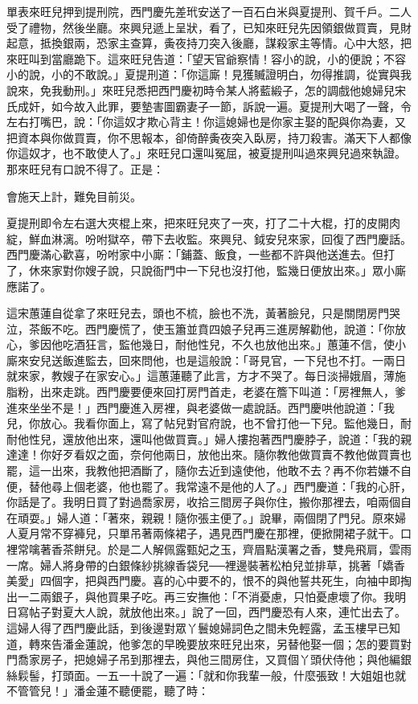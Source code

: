 單表來旺兒押到提刑院，西門慶先差玳安送了一百石白米與夏提刑、賀千戶。二人受了禮物，然後坐廳。來興兒遞上呈狀，看了，已知來旺兒先因領銀做買賣，見財起意，抵換銀兩，恐家主查算，夤夜持刀突入後廳，謀殺家主等情。心中大怒，把來旺叫到當廳跪下。這來旺兒告道：「望天官爺察情！容小的說，小的便說；不容小的說，小的不敢說。」夏提刑道：「你這廝！見獲贓證明白，勿得推調，從實與我說來，免我動刑。」來旺兒悉把西門慶初時令某人將藍緞子，怎的調戲他媳婦兒宋氏成奸，如今故入此罪，要墊害圖霸妻子一節，訴說一遍。夏提刑大喝了一聲，令左右打嘴巴，說：「你這奴才欺心背主！你這媳婦也是你家主娶的配與你為妻，又把資本與你做買賣，你不思報本，卻倚醉夤夜突入臥房，持刀殺害。滿天下人都像你這奴才，也不敢使人了。」來旺兒口還叫冤屈，被夏提刑叫過來興兒過來執證。那來旺兒有口說不得了。正是：

會施天上計，難免目前災。

夏提刑即令左右選大夾棍上來，把來旺兒夾了一夾，打了二十大棍，打的皮開肉綻，鮮血淋漓。吩咐獄卒，帶下去收監。來興兒、鉞安兒來家，回復了西門慶話。西門慶滿心歡喜，吩咐家中小廝：「鋪蓋、飯食，一些都不許與他送進去。但打了，休來家對你嫂子說，只說衙門中一下兒也沒打他，監幾日便放出來。」眾小廝應諾了。

這宋蕙蓮自從拿了來旺兒去，頭也不梳，臉也不洗，黃著臉兒，只是關閉房門哭泣，茶飯不吃。西門慶慌了，使玉簫並賁四娘子兒再三進房解勸他，說道：「你放心，爹因他吃酒狂言，監他幾日，耐他性兒，不久也放他出來。」蕙蓮不信，使小廝來安兒送飯進監去，回來問他，也是這般說：「哥見官，一下兒也不打。一兩日就來家，教嫂子在家安心。」這蕙蓮聽了此言，方才不哭了。每日淡掃娥眉，薄施脂粉，出來走跳。西門慶要便來回打房門首走，老婆在簷下叫道：「房裡無人，爹進來坐坐不是！」西門慶進入房裡，與老婆做一處說話。西門慶哄他說道：「我兒，你放心。我看你面上，寫了帖兒對官府說，也不曾打他一下兒。監他幾日，耐耐他性兒，還放他出來，還叫他做買賣。」婦人摟抱著西門慶脖子，說道：「我的親達達！你好歹看奴之面，奈何他兩日，放他出來。隨你教他做買賣不教他做買賣也罷，這一出來，我教他把酒斷了，隨你去近到遠使他，他敢不去？再不你若嫌不自便，替他尋上個老婆，他也罷了。我常遠不是他的人了。」西門慶道：「我的心肝，你話是了。我明日買了對過喬家房，收拾三間房子與你住，搬你那裡去，咱兩個自在頑耍。」婦人道：「著來，親親！隨你張主便了。」說畢，兩個閉了門兒。原來婦人夏月常不穿褲兒，只單吊著兩條裙子，遇見西門慶在那裡，便掀開裙子就干。口裡常噙著香茶餅兒。於是二人解佩露甄妃之玉，齊眉點漢署之香，雙鳧飛肩，雲雨一席。婦人將身帶的白銀條紗挑線香袋兒──裡邊裝著松柏兒並排草，挑著「嬌香美愛」四個字，把與西門慶。喜的心中要不的，恨不的與他誓共死生，向袖中即掏出一二兩銀子，與他買果子吃。再三安撫他：「不消憂慮，只怕憂慮壞了你。我明日寫帖子對夏大人說，就放他出來。」說了一回，西門慶恐有人來，連忙出去了。這婦人得了西門慶此話，到後邊對眾丫鬟媳婦詞色之間未免輕露，孟玉樓早已知道，轉來告潘金蓮說，他爹怎的早晚要放來旺兒出來，另替他娶一個；怎的要買對門喬家房子，把媳婦子吊到那裡去，與他三間房住，又買個丫頭伏侍他；與他編銀絲鬏髻，打頭面。一五一十說了一遍：「就和你我輩一般，什麼張致！大姐姐也就不管管兒！」潘金蓮不聽便罷，聽了時：

